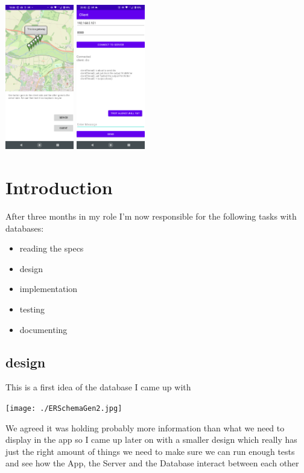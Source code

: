 \documentclass[a4paper,12pt]{article}
\begin{document}
\includegraphics[width=3cm]{./current_status_g8.PNG}
\includegraphics[width=3cm]{./client_g8.PNG}

\section{Introduction}

After three months in my role I'm now responsible for the following tasks with databases:

\begin{itemize}
\item {reading the specs}
\item design
\item implementation
\item testing 
\item documenting
\end{itemize}

\clearpage

\subsection{design}
This is a first idea of the database I came up with

\noindent \texttt{[image: ./ERSchemaGen2.jpg]}

We agreed it was holding probably more information than what we need to display in the app so I came up later on with a smaller design which really has just the right amount of things we need to make sure we can run enough tests and see how the App, the Server and the Database interact between each other
\clearpage
\end{document}
